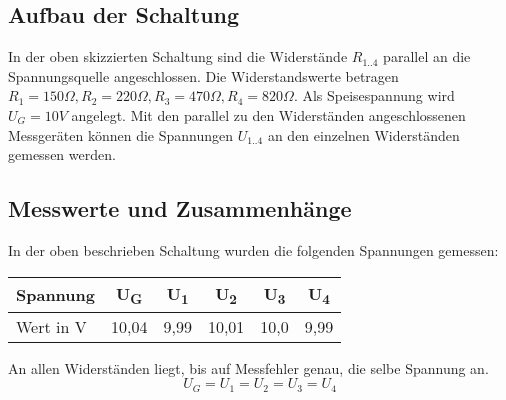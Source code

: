 \documentclass[
a4paper,     %
 headsepline, %
11pt         %
]{scrartcl}  %
\begin{document}
\begin{center}
\end{center}

\subsection{Aufbau der Schaltung}

In der oben skizzierten Schaltung sind die Widerstände $R_{1..4}$ parallel an die Spannungsquelle angeschlossen. 
Die Widerstandswerte betragen $ R_1 = 150 \Omega, R_2 = 220 \Omega, R_3=470 \Omega, R_4=820 \Omega$. 
Als Speisespannung wird $ U_G = 10V$ angelegt. 
Mit den parallel zu den Widerständen angeschlossenen Messgeräten können die Spannungen $U_{1..4}$ an den einzelnen Widerständen gemessen werden.

\subsection{Messwerte und Zusammenhänge}
In der oben beschrieben Schaltung wurden die folgenden Spannungen gemessen:
\begin{center}
  \begin{tabular}{ l | c | c | c | c | c}
    \hline
    Spannung   & U\textsubscript{G} & U\textsubscript{1} & U\textsubscript{2} & U\textsubscript{3} & U\textsubscript{4}  \\ \hline
    Wert in V  & 10,04 & 9,99 & 10,01 & 10,0 & 9,99 \\
    \hline
  \end{tabular}
\end{center}
An allen Widerständen liegt, bis auf Messfehler genau, die selbe Spannung an.
\[U_G=U_1=U_2=U_3=U_4\]
\end{document}
